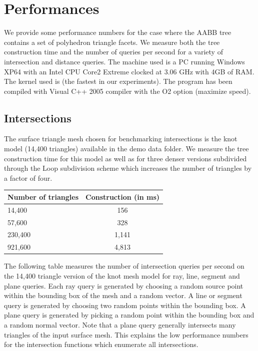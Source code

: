 \section{Performances}
\label{AABB_tree_section_performances}

We provide some performance numbers for the case where the AABB tree contains a set of polyhedron triangle facets. We measure both the tree construction time and the number of queries per second for a variety of intersection and distance queries. The machine used is a PC running Windows XP64 with an Intel CPU Core2 Extreme clocked at 3.06 GHz with 4GB of RAM. The kernel used is  (the fastest in our experiments). The program has been compiled with Visual C++ 2005 compiler with the O2 option (maximize speed).

\subsection{Intersections}

The surface triangle mesh chosen for benchmarking intersections is the knot model (14,400 triangles) available in the demo data folder. We measure the tree construction time for this model as well as for three denser versions subdivided through the Loop subdivision scheme which increases the number of triangles by a factor of four.

\begin{tabular}{|l|c|}
  \hline
  Number of triangles & Construction (in ms)\\
  \hline
   14,400 &   156 \\
   57,600 &   328 \\
  230,400 & 1,141 \\
  921,600 & 4,813 \\
  \hline
\end{tabular}

The following table measures the number of intersection queries per second on the 14,400 triangle version of the knot mesh model for ray, line, segment and plane queries. Each ray query is generated by choosing a random source point within the bounding box of the mesh and a random vector. A line or segment query is generated by choosing two random points within the bounding box. A plane query is generated by picking a random point within the bounding box and a random normal vector. Note that a plane query generally intersects many triangles of the input surface mesh. This explains the low performance numbers for the intersection functions which enumerate all intersections.

